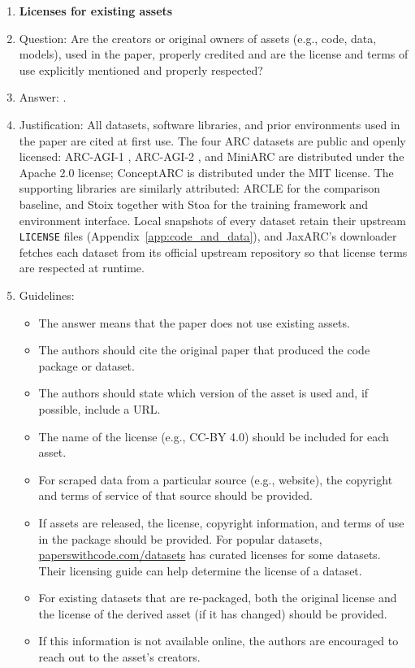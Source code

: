 \begin{enumerate}
\item {\bf Licenses for existing assets}
    \item[] Question: Are the creators or original owners of assets (e.g., code, data, models), used in the paper, properly credited and are the license and terms of use explicitly mentioned and properly respected?
    \item[] Answer: \answerYes{}.
    \item[] Justification: All datasets, software libraries, and prior environments used in the paper are cited at first use. The four ARC datasets are public and openly licensed: ARC-AGI-1 \citep{cholletMeasureIntelligence2019}, ARC-AGI-2 \citep{cholletARCAGI2NewChallenge2025}, and MiniARC \citep{kimPlaygroundsAbstractionReasoning2022} are distributed under the Apache 2.0 license; ConceptARC \citep{moskvichevConceptARCBenchmarkEvaluating2023} is distributed under the MIT license. The supporting libraries are similarly attributed: ARCLE \citep{leeARCLEAbstractionReasoning2025} for the comparison baseline, and Stoix \citep{toledoStoixDistributedSingleagent2024} together with Stoa \citep{toledoStoaJAXnativeInterface2025} for the training framework and environment interface. Local snapshots of every dataset retain their upstream \texttt{LICENSE} files (Appendix~\ref{app:code_and_data}), and JaxARC's downloader fetches each dataset from its official upstream repository so that license terms are respected at runtime.
    \item[] Guidelines:
    \begin{itemize}
        \item The answer \answerNA{} means that the paper does not use existing assets.
        \item The authors should cite the original paper that produced the code package or dataset.
        \item The authors should state which version of the asset is used and, if possible, include a URL.
        \item The name of the license (e.g., CC-BY 4.0) should be included for each asset.
        \item For scraped data from a particular source (e.g., website), the copyright and terms of service of that source should be provided.
        \item If assets are released, the license, copyright information, and terms of use in the package should be provided. For popular datasets, \url{paperswithcode.com/datasets} has curated licenses for some datasets. Their licensing guide can help determine the license of a dataset.
        \item For existing datasets that are re-packaged, both the original license and the license of the derived asset (if it has changed) should be provided.
        \item If this information is not available online, the authors are encouraged to reach out to the asset's creators.
    \end{itemize}


\end{enumerate}
